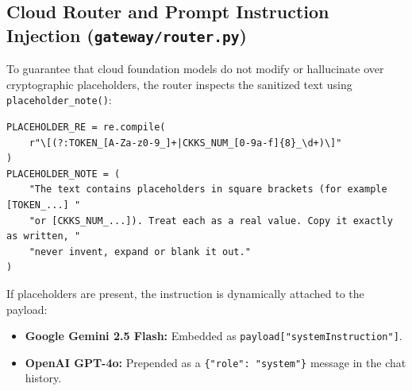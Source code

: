 \documentclass[12pt,a4paper,oneside]{report}
\numberwithin{equation}{chapter}
\begin{document}
\subsection{Cloud Router and Prompt Instruction Injection (\texttt{gateway/router.py})}
To guarantee that cloud foundation models do not modify or hallucinate over cryptographic placeholders, the router inspects the sanitized text using \texttt{placeholder\_note()}:
\begin{verbatim}
PLACEHOLDER_RE = re.compile(
    r"\[(?:TOKEN_[A-Za-z0-9_]+|CKKS_NUM_[0-9a-f]{8}_\d+)\]"
)
PLACEHOLDER_NOTE = (
    "The text contains placeholders in square brackets (for example [TOKEN_...] "
    "or [CKKS_NUM_...]). Treat each as a real value. Copy it exactly as written, "
    "never invent, expand or blank it out."
)
\end{verbatim}
If placeholders are present, the instruction is dynamically attached to the payload:
\begin{itemize}[leftmargin=*]
    \item \textbf{Google Gemini 2.5 Flash:} Embedded as \texttt{payload["systemInstruction"]}.
    \item \textbf{OpenAI GPT-4o:} Prepended as a \texttt{\{"role": "system"\}} message in the chat history.
\end{itemize}
\end{document}
